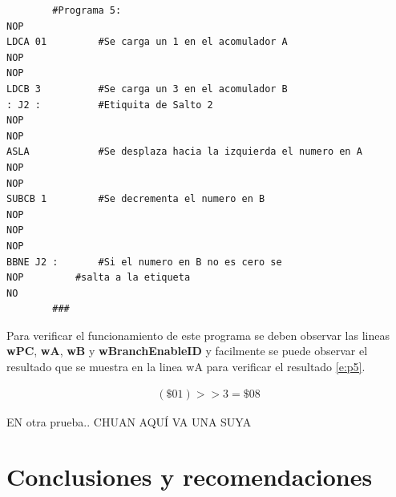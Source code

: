 \documentclass[paper=letter, fontsize=12pt]{article}
\begin{document}
\begin{lstlisting}
		#Programa 5:
NOP
LDCA 01			#Se carga un 1 en el acomulador A
NOP
NOP
LDCB 3			#Se carga un 3 en el acomulador B
: J2 :			#Etiquita de Salto 2
NOP
NOP
ASLA			#Se desplaza hacia la izquierda el numero en A
NOP
NOP
SUBCB 1			#Se decrementa el numero en B
NOP
NOP
NOP
BBNE J2 :		#Si el numero en B no es cero se 
NOP			#salta a la etiqueta
NO
		###
\end{lstlisting}

Para verificar el funcionamiento de este programa se deben observar las lineas \textbf{wPC}, \textbf{wA}, \textbf{wB} y \textbf{wBranchEnableID} y facilmente se puede observar el resultado que se muestra en la linea wA para verificar el resultado \ref{e:p5}.

\begin{align} 
\label{e:p5}
(\$01) >> 3 = \$08
\end{align}

EN otra prueba.. CHUAN AQUÍ VA UNA SUYA

\clearpage
\section{Conclusiones y recomendaciones}
\end{document}
